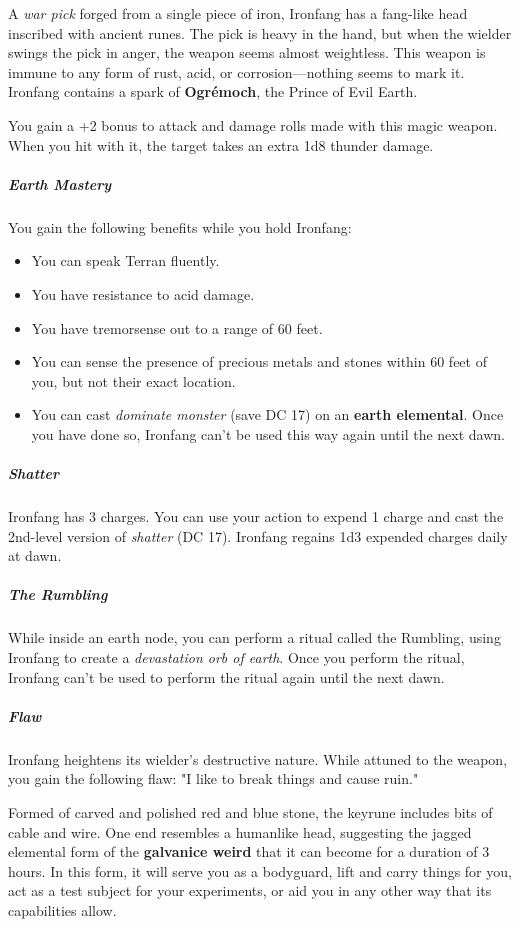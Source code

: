\documentclass[10pt,a4paper,twoside,bg=print,twocolumn,openany,nodeprecatedcode]{dndbook}
\begin{document}
A \textit{war pick} forged from a single piece of iron, Ironfang has a fang-like head inscribed with ancient runes. The pick is heavy in the hand, but when the wielder swings the pick in anger, the weapon seems almost weightless. This weapon is immune to any form of rust, acid, or corrosion—nothing seems to mark it. Ironfang contains a spark of \textbf{Ogrémoch}, the Prince of Evil Earth.

You gain a +2 bonus to attack and damage rolls made with this magic weapon. When you hit with it, the target takes an extra 1d8 thunder damage.

\subparagraph{Earth Mastery}
You gain the following benefits while you hold Ironfang:


\begin{itemize}
\item You can speak Terran fluently.
\item You have resistance to acid damage.
\item You have tremorsense out to a range of 60 feet.
\item You can sense the presence of precious metals and stones within 60 feet of you, but not their exact location.
\item You can cast \textit{dominate monster} (save DC 17) on an \textbf{earth elemental}. Once you have done so, Ironfang can't be used this way again until the next dawn.
\end{itemize}

\subparagraph{Shatter}
Ironfang has 3 charges. You can use your action to expend 1 charge and cast the 2nd-level version of \textit{shatter} (DC 17). Ironfang regains 1d3 expended charges daily at dawn.

\subparagraph{The Rumbling}
While inside an earth node, you can perform a ritual called the Rumbling, using Ironfang to create a \textit{devastation orb of earth}. Once you perform the ritual, Ironfang can't be used to perform the ritual again until the next dawn.

\subparagraph{Flaw}
Ironfang heightens its wielder's destructive nature. While attuned to the weapon, you gain the following flaw: "I like to break things and cause ruin."

Formed of carved and polished red and blue stone, the keyrune includes bits of cable and wire. One end resembles a humanlike head, suggesting the jagged elemental form of the \textbf{galvanice weird} that it can become for a duration of 3 hours. In this form, it will serve you as a bodyguard, lift and carry things for you, act as a test subject for your experiments, or aid you in any other way that its capabilities allow.
\end{document}
